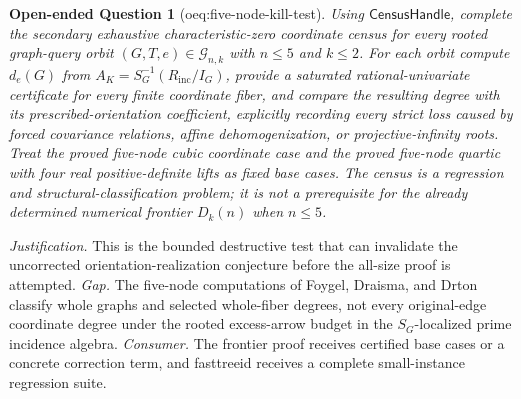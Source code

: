 \documentclass{article}
\newtheorem{openendedquestion}{Open-ended Question}
\begin{document}
\begin{openendedquestion}[oeq:five-node-kill-test]\label{oeq:five-node-kill-test}
Using \(\mathsf{CensusHandle}\), complete the secondary exhaustive characteristic-zero coordinate census for every rooted graph-query orbit \((G,T,e)\in\mathcal G_{n,k}\) with \(n\le5\) and \(k\le2\). For each orbit compute \(d_e(G)\) from \(A_K=S_G^{-1}(R_{\mathrm{inc}}/I_G)\), provide a saturated rational-univariate certificate for every finite coordinate fiber, and compare the resulting degree with its prescribed-orientation coefficient, explicitly recording every strict loss caused by forced covariance relations, affine dehomogenization, or projective-infinity roots. Treat the proved five-node cubic coordinate case and the proved five-node quartic with four real positive-definite lifts as fixed base cases. The census is a regression and structural-classification problem; it is not a prerequisite for the already determined numerical frontier \(D_k(n)\) when \(n\le5\).
\end{openendedquestion}
\par\smallskip\noindent \textit{Justification.} This is the bounded destructive test that can invalidate the uncorrected orientation-realization conjecture before the all-size proof is attempted. \textit{Gap.} The five-node computations of Foygel, Draisma, and Drton classify whole graphs and selected whole-fiber degrees, not every original-edge coordinate degree under the rooted excess-arrow budget in the \(S_G\)-localized prime incidence algebra. \textit{Consumer.} The frontier proof receives certified base cases or a concrete correction term, and fasttreeid receives a complete small-instance regression suite.
\end{document}
